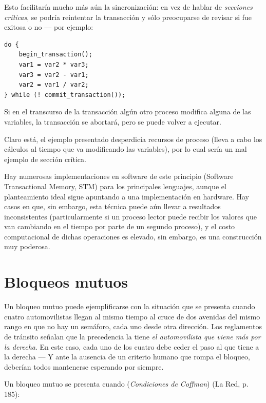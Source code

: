 \documentclass[11pt,fleqn]{book} %
\begin{document}
      Esto facilitaría mucho más aún la sincronización: en vez de
      hablar de \emph{secciones críticas}, se podría reintentar la
      transacción y sólo preocuparse de revisar si fue exitosa o no —
      por ejemplo:


\begin{verbatim}
do {
    begin_transaction();
    var1 = var2 * var3;
    var3 = var2 - var1;
    var2 = var1 / var2;
} while (! commit_transaction());
\end{verbatim}

      Si en el transcurso de la transacción algún otro proceso
      modifica alguna de las variables, la transacción se abortará,
      pero se puede volver a ejecutar.

      Claro está, el ejemplo presentado desperdicia recursos de
      proceso (lleva a cabo los cálculos al tiempo que va modificando
      las variables), por lo cual sería un mal ejemplo de sección
      crítica.

      Hay numerosas implementaciones en software de este principio
      (Software Transactional Memory, STM) para los principales
      lenguajes, aunque el planteamiento ideal sigue apuntando a una
      implementación en hardware. Hay casos en que, sin embargo, esta
      técnica puede aún llevar a resultados inconsistentes
      (particularmente si un proceso lector puede recibir los valores
      que van cambiando en el tiempo por parte de un segundo proceso),
      y el costo computacional de dichas operaciones es elevado, sin
      embargo, es una construcción muy poderosa.
\section{Bloqueos mutuos}
\label{sec-3-4}
\label{PROC_bloq_mutuos}


Un bloqueo mutuo puede ejemplificarse con la situación que se presenta
cuando cuatro automovilistas llegan al mismo tiempo al cruce de dos
avenidas del mismo rango en que no hay un semáforo, cada uno desde
otra dirección. Los reglamentos de tránsito señalan que la precedencia
la tiene \emph{el automovilista que viene más por la derecha}. En este
caso, cada uno de los cuatro debe ceder el paso al que tiene a la
derecha — Y ante la ausencia de un criterio humano que rompa el
bloqueo, deberían todos mantenerse esperando por siempre.


Un bloqueo mutuo se presenta cuando (\emph{Condiciones de Coffman}) (La
Red, p. 185):
\end{document}
